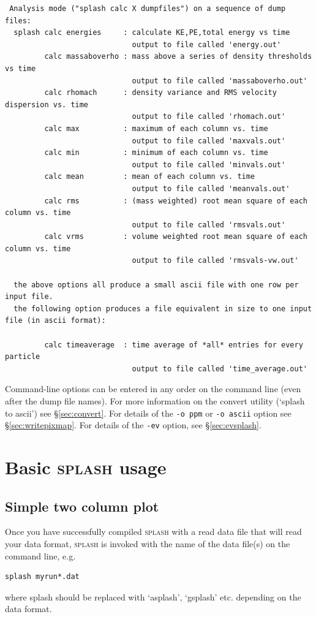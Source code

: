\documentclass[a4paper,10pt]{article}
\newcommand{\splash}{\textsc{splash }}
\begin{document}
\begin{verbatim}
 Analysis mode ("splash calc X dumpfiles") on a sequence of dump files: 
  splash calc energies     : calculate KE,PE,total energy vs time
                             output to file called 'energy.out'
         calc massaboverho : mass above a series of density thresholds vs time
                             output to file called 'massaboverho.out'
         calc rhomach      : density variance and RMS velocity dispersion vs. time
                             output to file called 'rhomach.out'
         calc max          : maximum of each column vs. time
                             output to file called 'maxvals.out'
         calc min          : minimum of each column vs. time
                             output to file called 'minvals.out'
         calc mean         : mean of each column vs. time
                             output to file called 'meanvals.out'
         calc rms          : (mass weighted) root mean square of each column vs. time
                             output to file called 'rmsvals.out'
         calc vrms         : volume weighted root mean square of each column vs. time
                             output to file called 'rmsvals-vw.out'

  the above options all produce a small ascii file with one row per input file.
  the following option produces a file equivalent in size to one input file (in ascii format):

         calc timeaverage  : time average of *all* entries for every particle
                             output to file called 'time_average.out'
\end{verbatim}

 Command-line options can be entered in any order on the command line (even after the dump file names). For more information on the convert utility (`splash to ascii') see \S\ref{sec:convert}. For details of the \verb+-o ppm+ or \verb+-o ascii+ option see \S\ref{sec:writepixmap}. For details of the \verb+-ev+ option, see \S\ref{sec:evsplash}.

\section{Basic \splash usage}
\label{sec:basic}

\subsection{Simple two column plot}
 Once you have successfully compiled \splash with a read data file that will read your data format,
\splash is invoked with the name of the data
file(s) on the command line, e.g.
\begin{verbatim}
splash myrun*.dat
\end{verbatim}
where splash should be replaced with `asplash', `gsplash' etc. depending on the data format. \\
\end{document}
